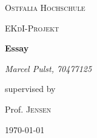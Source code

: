 \documentclass[12pt]{scrartcl}
\begin{document}
\begin{titlepage}
	\centering
	{\scshape\LARGE Ostfalia Hochschule \par}
	\vspace{1cm}
	{\scshape\Large EKdI-Projekt\par}
	\vspace{1.5cm}
	{\huge\bfseries Essay\par}
	\vspace{2cm}
	{\Large\itshape Marcel Pulst, 70477125\par}
	\vfill
	supervised by\par
	Prof. \textsc{Jensen}

	\vfill

	{\large \today\par}
\end{titlepage}
\end{document}

